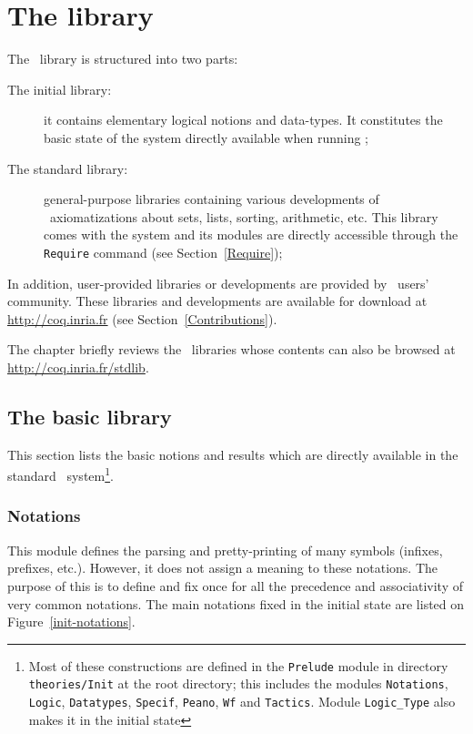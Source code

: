 \chapter[The {\Coq} library]{The {\Coq} library\label{Theories}}

The \Coq\ library is structured into two parts:

\begin{description}
\item[The initial library:] it contains
  elementary logical notions and data-types. It constitutes the
  basic state of the system directly available when running
  \Coq;

\item[The standard library:] general-purpose libraries containing
  various developments of \Coq\ axiomatizations about sets, lists,
  sorting, arithmetic, etc. This library comes with the system and its
  modules are directly accessible through the \verb!Require! command
  (see Section~\ref{Require});
\end{description}

In addition, user-provided libraries or developments are provided by
\Coq\ users' community. These libraries and developments are available
for download at \url{http://coq.inria.fr} (see
Section~\ref{Contributions}).

The chapter briefly reviews the \Coq\ libraries whose contents can
also be browsed at \url{http://coq.inria.fr/stdlib}.

\section[The basic library]{The basic library\label{Prelude}}

This section lists the basic notions and results which are directly
available in the standard \Coq\ system\footnote{Most
of these constructions are defined in the
{\tt Prelude} module in directory {\tt theories/Init} at the {\Coq}
root directory; this includes the modules
{\tt Notations},
{\tt Logic},
{\tt Datatypes},
{\tt Specif},
{\tt Peano},
{\tt Wf} and
{\tt Tactics}.
Module {\tt Logic\_Type} also makes it in the initial state}.

\subsection[Notations]{Notations\label{Notations}}

This module defines the parsing and pretty-printing of many symbols
(infixes, prefixes, etc.). However, it does not assign a meaning to
these notations. The purpose of this is to define and fix once for all
the precedence and associativity of very common notations. The main
notations fixed in the initial state are listed on
Figure~\ref{init-notations}.

